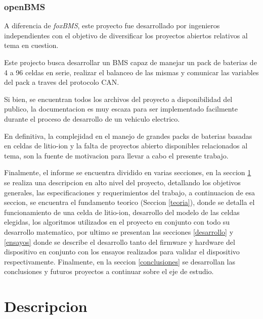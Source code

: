 \documentclass[10pt,a4paper]{article}
\begin{document}
    \clearpage

    \subsubsection{openBMS}

    A diferencia de \emph{foxBMS}, este proyecto fue desarrollado por 
    ingenieros independientes con el objetivo de diversificar los proyectos 
    abiertos relativos al tema en cuestion.
    
    \noindent Este projecto busca desarrollar un BMS capaz de manejar un pack 
    de baterias de 4 a 96 celdas en serie, realizar el balanceo de las mismas y 
    comunicar las variables del pack a traves del protocolo CAN.
    
    \noindent Si bien, se encuentran todos los archivos del proyecto a 
    disponibilidad del publico, la documentacion es muy escaza 
    para ser implementado facilmente durante el proceso de desarrollo de un
    vehiculo electrico.
    
    \noindent En definitiva, la complejidad en el manejo de grandes packs de 
    baterias basadas en celdas de litio-ion y la falta de proyectos abierto 
    disponibles relacionados al tema, son la fuente de motivacion para 
    llevar a cabo el presente trabajo.
    
    \noindent Finalmente, el informe se encuentra dividido en varias secciones, 
    en la seccion \ref{descripcion} se realiza una descripcion en alto nivel del
    proyecto, detallando los objetivos generales, las especificaciones y
    requerimientos del trabajo, a continuacion de esa seccion, se encuentra el
    fundamento teorico (Seccion \ref{teoria}), donde se detalla el 
    funcionamiento de una celda de litio-ion, desarrollo del modelo de las 
    celdas elegidas, los algoritmos utilizados en el proyecto en conjunto con 
    todo su desarrollo matematico, por ultimo se presentan las secciones 
    \ref{desarrollo} y \ref{ensayos} donde se describe el desarrollo tanto del 
    firmware y hardware del dispositivo en conjunto con los ensayos realizados 
    para validar el dispositivo respectivamente. Finalmente, en la seccion 
    \ref{conclusiones} se desarrollan las conclusiones y futuros proyectos a 
    continuar sobre el eje de estudio.
	
	\clearpage
	
    \section{Descripcion}\label{descripcion}
	
\end{document}
